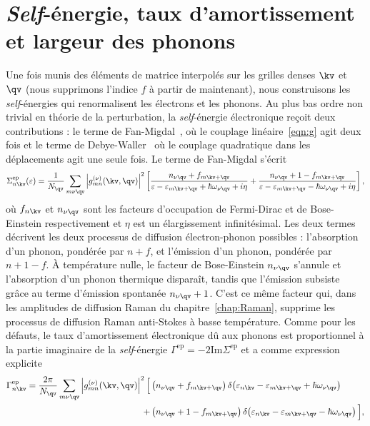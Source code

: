 \section{\textit{Self}-énergie, taux d'amortissement et largeur des phonons}\label{sec:g_self}

Une fois munis des éléments de matrice interpolés sur les grilles denses $\kv$ et $\qv$ (nous supprimons l'indice $f$ à partir de maintenant), nous construisons les \textit{self}-énergies qui renormalisent les électrons et les phonons. Au plus bas ordre non trivial en théorie de la perturbation, la \textit{self}-énergie électronique reçoit deux contributions : le terme de Fan-Migdal~\cite{fanTemperatureDependenceEnergy1951,migdalINTERACTIONELECTRONSLATTICE1958}, où le couplage linéaire~\eqref{eqn:g} agit deux fois et le terme de Debye-Waller~\cite{allenTheoryTemperatureDependence1976,allenTheoryTemperatureDependence1981} où le couplage quadratique dans les déplacements agit une seule fois. Le terme de Fan-Migdal s'écrit
\begin{equation}
    \Sigma^\text{ep}_{n\kv}(\varepsilon) = \frac{1}{N_\qv}\sum_{m\nu\qv}
    \left|g_{mn}^{(\nu)}(\kv,\qv)\right|^2
    \left[
    \frac{n_{\nu\qv}+f_{m\kv+\qv}}{\varepsilon-\varepsilon_{m\kv+\qv}+\hbar\omega_{\nu\qv}+i\eta}
    +\frac{n_{\nu\qv}+1-f_{m\kv+\qv}}{\varepsilon-\varepsilon_{m\kv+\qv}-\hbar\omega_{\nu\qv}+i\eta}
    \right],
    \label{eqn:fan_migdal}
\end{equation}
où $f_{n\kv}$ et $n_{\nu\qv}$ sont les facteurs d'occupation de Fermi-Dirac et de Bose-Einstein respectivement et $\eta$ est un élargissement infinitésimal. Les deux termes décrivent les deux processus de diffusion électron-phonon possibles : l'absorption d'un phonon, pondérée par $n+f$, et l'émission d'un phonon, pondérée par $n+1-f$. À température nulle, le facteur de Bose-Einstein $n_{\nu\qv}$ s'annule et l'absorption d'un phonon thermique disparaît, tandis que l'émission subsiste grâce au terme d'émission spontanée $n_{\nu\qv}+1$. C'est ce même facteur qui, dans les amplitudes de diffusion Raman du chapitre~\ref{chap:Raman}, supprime les processus de diffusion Raman anti-Stokes à basse température. Comme pour les défauts, le taux d'amortissement électronique dû aux phonons est proportionnel à la partie imaginaire de la \textit{self}-énergie $\Gamma^\text{ep} =-2\mathrm{Im}\Sigma^\text{ep}$ et a comme expression explicite
\begin{align}
    \Gamma^\text{ep}_{n\kv} = \frac{2\pi}{N_\qv}\sum_{m\nu\qv}
    \left|g_{mn}^{(\nu)}(\kv,\qv)\right|^2
    \Big[&\left(n_{\nu\qv}+f_{m\kv+\qv}\right)
    \delta\!\left(\varepsilon_{n\kv}-\varepsilon_{m\kv+\qv}+\hbar\omega_{\nu\qv}\right)\notag\\
    +&\left(n_{\nu\qv}+1-f_{m\kv+\qv}\right)
    \delta\!\left(\varepsilon_{n\kv}-\varepsilon_{m\kv+\qv}-\hbar\omega_{\nu\qv}\right)\Big],
    \label{eqn:gamma_ep_explicite}
\end{align}
